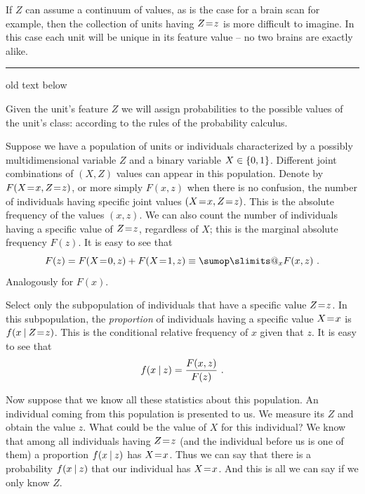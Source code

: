 \documentclass[\ifafour a4paper,12pt,\else a5paper,10pt,\fi%
onecolumn,oneside,article,%
british%
]{memoir}
\makeatletter
\theoremstyle{remark}
\theoremstyle{innote}
\def\sum{\DOTSI\sumop\slimits@}
\DeclarePairedDelimiter\set{\{}{\}} %
\renewcommand*{\|}[1][]{\nonscript\:#1\vert\nonscript\:\mathopen{}}
\newcommand*{\mo}[1][=]{\mathrel{\mkern-3.5mu#1\mkern-3.5mu}}
\newcommand{\mynote}[1]{ {\color{notecolour}#1}}
\makeatother
\begin{document}
If $Z$ can assume a continuum of values, as is the case for a brain scan for example, then the collection of units having $Z\mo z$ is more difficult to imagine. In this case each unit will be unique in its feature value -- no two brains are exactly alike.




\mynote{\medskip\hrule old text below}

Given the unit's feature $Z$ we will assign probabilities to the possible values of the unit's class:  according to the rules of the probability calculus.


Suppose we have a population of units or individuals characterized by a possibly multidimensional variable $Z$ and a binary variable $X \in \set{0,1}$. Different joint combinations of $(X,Z)$ values can appear in this population. Denote by $F(X\mo x, Z\mo z)$, or more simply $F(x, z)$ when there is no confusion, the number of individuals having specific joint values $(X\mo x, Z\mo z)$. This is the absolute frequency of the values $(x,z)$. We can also count the number of individuals having a specific value of $Z\mo z$, regardless of $X$; this is the marginal absolute frequency $F(z)$. It is easy to see that
\begin{equation}
  \label{eq:marginal_prob}
  F(z) = F(X\mo 0, z) + F(X\mo 1, z) \equiv \sum_{x} F(x,z)\ .
\end{equation}
Analogously for $F(x)$.

Select only the subpopulation of individuals that have a specific value $Z\mo z$. In this subpopulation, the \emph{proportion} of individuals having a specific value $X\mo x$ is $f(x\| Z\mo z)$. This is the conditional relative frequency of $x$ given that $z$. It is easy to see that
\begin{equation}
  \label{eq:cond_prob}
  f(x \| z) = \frac{F(x,z)}{F(z)} \ .
\end{equation}

Now suppose that we know all these statistics about this population. An
individual coming from this population is presented to us. We measure its
$Z$ and obtain the value $z$. What could be the value of $X$ for this
individual? We know that among all individuals having $Z\mo z$ (and the
individual before us is one of them) a proportion $f(x \| z)$ has $X\mo x$.
Thus we can say that there is a probability $f(x \| z)$ that our individual
has $X\mo x$. And this is all we can say if we only know $Z$.

\medskip
\end{document}
